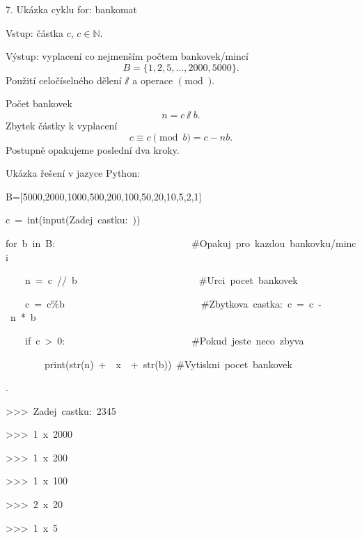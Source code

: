 \documentclass[czech]{beamer}
\newenvironment{lyxcode}
  {\par\begin{list}{}{
    \setlength{\rightmargin}{\leftmargin}
    \setlength{\listparindent}{0pt}%
    \raggedright
    \setlength{\itemsep}{0pt}
    \setlength{\parsep}{0pt}
    \normalfont\ttfamily}%
   \def\{{\char`\{}
   \def\}{\char`\}}
   \def\textasciitilde{\char`\~}
   \item[]}
  {\end{list}}
\begin{document}
\begin{frame}[plain]{7. Ukázka cyklu for: bankomat }

{\tiny Vstup: částka $c$, $c\in\mathbb{N}$.}{\tiny\par}

{\tiny Výstup: vyplacení co nejmenším počtem bankovek/mincí
\[
B=\{1,2,5,...,2000,5000\}.
\]
Použití celočíselného dělení $\sslash$ a operace $\pmod{}$.}{\tiny\par}

{\tiny Počet bankovek
\[
n=c\sslash b.
\]
Zbytek částky k vyplacení
\[
c\equiv c\pmod b=c-nb.
\]
Postupně opakujeme poslední dva kroky.\medskip{}
}{\tiny\par}

{\tiny Ukázka řešení v jazyce Python:}{\tiny\par}
\begin{lyxcode}
{\tiny B={[}5000,2000,1000,500,200,100,50,20,10,5,2,1{]}~~}{\tiny\par}

{\tiny c~=~int(input(\textquotedbl Zadej~castku:~\textquotedbl ))}{\tiny\par}

{\tiny for~b~in~B:~~~~~~~~~~~~~~~~~~~~~~~~~~~~\#Opakuj~pro~kazdou~bankovku/minci}{\tiny\par}

{\tiny ~~~~n~=~c~//~b~~~~~~~~~~~~~~~~~~~~~~~~~\#Urci~pocet~bankovek}{\tiny\par}

{\tiny ~~~~c~=~c\%b~~~~~~~~~~~~~~~~~~~~~~~~~~~~\#Zbytkova~castka:~c~=~c~-~n~{*}~b~}{\tiny\par}

{\tiny ~~~~if~c~>~0:~~~~~~~~~~~~~~~~~~~~~~~~~~\#Pokud~jeste~neco~zbyva}{\tiny\par}

{\tiny ~~~~~~~~print(str(n)~+~\textquotedbl ~x~\textquotedbl ~+~str(b))~\#Vytiskni~pocet~bankovek}{\tiny\par}

{\tiny .}{\tiny\par}

{\tiny >\textcompwordmark >\textcompwordmark >~Zadej~castku:~2345}{\tiny\par}

{\tiny >\textcompwordmark >\textcompwordmark >~1~x~2000}{\tiny\par}

{\tiny >\textcompwordmark >\textcompwordmark >~1~x~200}{\tiny\par}

{\tiny >\textcompwordmark >\textcompwordmark >~1~x~100}{\tiny\par}

{\tiny >\textcompwordmark >\textcompwordmark >~2~x~20}{\tiny\par}

{\tiny >\textcompwordmark >\textcompwordmark >~1~x~5}{\tiny\par}
\end{lyxcode}
\end{frame}
\end{document}
